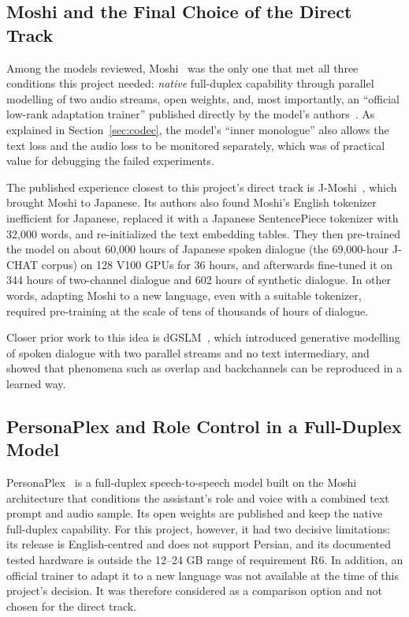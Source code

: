 \subsection{Moshi and the Final Choice of the Direct Track}

Among the models reviewed, Moshi~\cite{defossez2024moshi} was the only one that met
all three conditions this project needed: \emph{native} full-duplex capability
through parallel modelling of two audio streams, open weights, and, most
importantly, an ``official low-rank adaptation trainer'' published directly by the
model's authors~\cite{moshifinetune2024}. As explained in Section~\ref{sec:codec},
the model's ``inner monologue'' also allows the text loss and the audio loss to be
monitored separately, which was of practical value for debugging the failed
experiments.

The published experience closest to this project's direct track is
J-Moshi~\cite{ohashi2025jmoshi}, which brought Moshi to Japanese. Its authors also
found Moshi's English tokenizer inefficient for Japanese, replaced it with a
Japanese SentencePiece tokenizer with 32,000 words, and re-initialized the text
embedding tables. They then pre-trained the model on about 60,000 hours of Japanese
spoken dialogue (the 69,000-hour J-CHAT corpus) on 128 V100 GPUs for 36 hours, and
afterwards fine-tuned it on 344 hours of two-channel dialogue and 602 hours of
synthetic dialogue. In other words, adapting Moshi to a new language, even with a
suitable tokenizer, required pre-training at the scale of tens of thousands of hours
of dialogue.

Closer prior work to this idea is dGSLM~\cite{nguyen2023dgslm}, which introduced
generative modelling of spoken dialogue with two parallel streams and no text
intermediary, and showed that phenomena such as overlap and backchannels can be
reproduced in a learned way.

\subsection{PersonaPlex and Role Control in a Full-Duplex Model}

PersonaPlex~\cite{roy2026personaplex} is a full-duplex speech-to-speech model built
on the Moshi architecture that conditions the assistant's role and voice with a
combined text prompt and audio sample. Its open weights are published and keep the
native full-duplex capability. For this project, however, it had two decisive
limitations: its release is English-centred and does not support Persian, and its
documented tested hardware is outside the 12--24 GB range of requirement R6. In
addition, an official trainer to adapt it to a new language was not available at the
time of this project's decision. It was therefore considered as a comparison option
and not chosen for the direct track.


